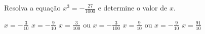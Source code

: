 Resolva a equação $x^3=-\frac{27}{1000}$ e determine o valor de $x$.

$x=-\frac{3}{10}$
$x=-\frac{9}{10}$
$x=\frac{3}{100}$ ou $x=-\frac{3}{100}$
$x=\frac{9}{10}$ ou $x=-\frac{9}{10}$
$x=\frac{91}{10}$


